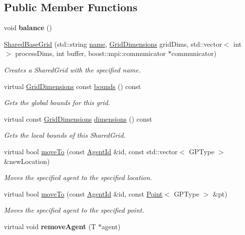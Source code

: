 \subsection*{Public Member Functions}
\begin{DoxyCompactItemize}
\item 
\hypertarget{classrepast_1_1_shared_base_grid_a6e2cf26b8580f27b9f4bda6afb125987}{void {\bfseries balance} ()}\label{classrepast_1_1_shared_base_grid_a6e2cf26b8580f27b9f4bda6afb125987}

\item 
\hyperlink{classrepast_1_1_shared_base_grid_ab808a78a300f302f67cc48ec8a5192fa}{Shared\-Base\-Grid} (std\-::string \hyperlink{classrepast_1_1_projection_ab60a0ab4f584685780307d7431b61800}{name}, \hyperlink{classrepast_1_1_grid_dimensions}{Grid\-Dimensions} grid\-Dims, std\-::vector$<$ int $>$ process\-Dims, int buffer, boost\-::mpi\-::communicator $\ast$communicator)
\begin{DoxyCompactList}\small\item\em Creates a Shared\-Grid with the specified name. \end{DoxyCompactList}\item 
virtual \hyperlink{classrepast_1_1_grid_dimensions}{Grid\-Dimensions} const \hyperlink{classrepast_1_1_shared_base_grid_ae27f5b997e9366cc6bf683f16067be2f}{bounds} () const 
\begin{DoxyCompactList}\small\item\em Gets the global bounds for this grid. \end{DoxyCompactList}\item 
virtual const \hyperlink{classrepast_1_1_grid_dimensions}{Grid\-Dimensions} \hyperlink{classrepast_1_1_shared_base_grid_a9ec19652232000368ec1fe98ff47e121}{dimensions} () const 
\begin{DoxyCompactList}\small\item\em Gets the local bounds of this Shared\-Grid. \end{DoxyCompactList}\item 
virtual bool \hyperlink{classrepast_1_1_shared_base_grid_a480fc6f517d1bb098c7ee47450fba522}{move\-To} (const \hyperlink{classrepast_1_1_agent_id}{Agent\-Id} \&id, const std\-::vector$<$ G\-P\-Type $>$ \&new\-Location)
\begin{DoxyCompactList}\small\item\em Moves the specified agent to the specified location. \end{DoxyCompactList}\item 
virtual bool \hyperlink{classrepast_1_1_shared_base_grid_ab4d74c36e126cffa5638aeaab6c0df85}{move\-To} (const \hyperlink{classrepast_1_1_agent_id}{Agent\-Id} \&id, const \hyperlink{classrepast_1_1_point}{Point}$<$ G\-P\-Type $>$ \&pt)
\begin{DoxyCompactList}\small\item\em Moves the specified agent to the specified point. \end{DoxyCompactList}\item 
\hypertarget{classrepast_1_1_shared_base_grid_ace1d00758e418a574263997e7db2f26a}{virtual void {\bfseries remove\-Agent} (T $\ast$agent)}\label{classrepast_1_1_shared_base_grid_ace1d00758e418a574263997e7db2f26a}


\end{DoxyCompactItemize}
